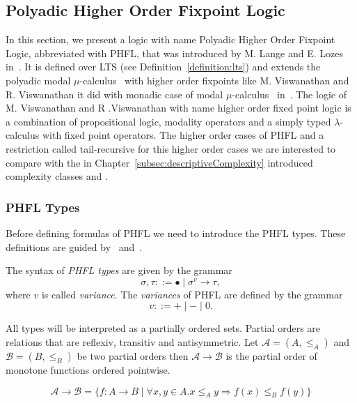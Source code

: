 
\subsection{Polyadic Higher Order Fixpoint Logic}\label{subsec:polyadicHigherOrderFixpointLogic}

In this section, we present a logic with name Polyadic Higher Order Fixpoint Logic, abbreviated with PHFL, that was
introduced by M. Lange and E. Lozes in~\cite{lange2014capturing}. It is defined over LTS (see
Definition~\ref{definition:lts}) and extends the polyadic modal $\mu$-calculus~\cite{otto1999bisimulation} with
higher order fixpoints like M. Viswanathan and R. Viswanathan it did with monadic case of modal
$\mu$-calculus~\cite{kozen1983results} in~\cite{viswanathan2004higher}. The logic of M. Viswanathan and R
.Viswanathan with name higher order fixed point logic is a combination of propositional logic, modality operators and
a simply typed $\lambda$-calculus with fixed point operators. The higher order cases of PHFL and a restriction called
tail-recursive for this higher order cases we are interested to compare with the in
Chapter~\ref{subsec:descriptiveComplexity} introduced complexity classes  and .

\subsubsection{PHFL Types}

Before defining formulas of PHFL we need to introduce the PHFL types. These definitions are guided
by~\cite{viswanathan2004higher} and~\cite{lange2014capturing}.

\begin{definition}
    The syntax of \emph{PHFL types} are given by the grammar
    \[\sigma, \tau ::= \bullet \mid \sigma^v \rightarrow \tau,\]
    where $v$ is called \textit{variance}. The \emph{variances} of PHFL are defined by the grammar
    \[v ::= + \mid - \mid 0.\]
\end{definition}

All types will be interpreted as a partially ordered sets. Partial orders are relations that are reflexiv, transitiv
and antisymmetric. Let $\mathcal{A} = (A, \leq_A)$ and $\mathcal{B} = (B, \leq_B)$ be two partial orders then
$\mathcal{A} \rightarrow \mathcal{B}$ is the partial order of monotone functions ordered pointwise.

\[\mathcal{A} \rightarrow \mathcal{B} = \{f:A\rightarrow B \mid \forall x,y \in A. x\leq_A y\Rightarrow f(x)\leq_B f(y)\}\]

